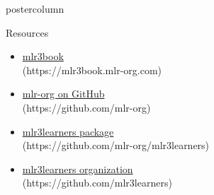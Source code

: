 \documentclass{beamer}
\begin{document}
\begin{withoutheader}
\begin{frame}[fragile]{}
\begin{columns}
\begin{column}{.245\textwidth}
\begin{beamercolorbox}[center]{postercolumn}
\begin{minipage}{.98\textwidth}
{\begin{myblock}{Resources}
\begin{itemize}
								\item \href{https://mlr3book.mlr-org.com/index.html}{mlr3book}\\ (https://mlr3book.mlr-org.com)
								\item \href{https://github.com/mlr-org}{mlr-org on GitHub}\\ (https://github.com/mlr-org)
								\item \href{https://github.com/mlr-org/mlr3learners}{mlr3learners package}\\ (https://github.com/mlr-org/mlr3learners)
								\item \href{https://github.com/mlr3learners}{mlr3learners organization}\\ (https://github.com/mlr3learners)
							\end{itemize}
						\end{myblock}
					\vfill}
				\end{minipage}
			\end{beamercolorbox}
		\end{column}
	\end{columns}
\end{frame}
\end{withoutheader}
\end{document}
